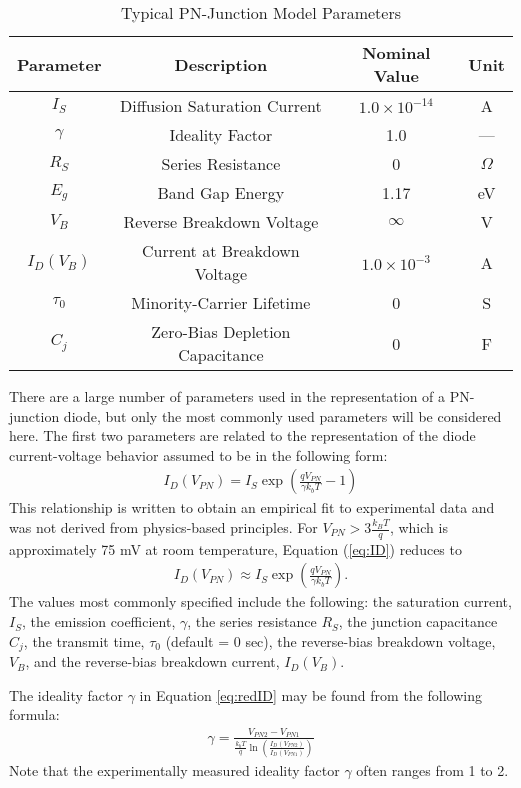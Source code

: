 \documentclass[12pt]{../manual}
\begin{document}
\begin{table}[ht!]
\caption{Typical PN-Junction Model Parameters}
\centering
\begin{tabular}{|c|c|c|c|} \hline
Parameter & Description & Nominal Value & Unit \\ \hline \hline
$I_S$ & Diffusion Saturation Current & $1.0 \times 10^{-14}$ & A \\ \hline
$\gamma$ & Ideality Factor & 1.0 & --- \\ \hline
$R_S$ & Series Resistance & 0 & $\Omega$ \\ \hline
$E_g$ & Band Gap Energy & 1.17 & eV \\ \hline
$V_B$ & Reverse Breakdown Voltage & $\infty$ & V \\ \hline
$I_D(V_B)$ & Current at Breakdown Voltage & $1.0 \times 10^{-3}$ & A \\ \hline
$\tau_0$ & Minority-Carrier Lifetime & 0 & S \\ \hline
$C_j$ & Zero-Bias Depletion Capacitance & 0 & F \\ \hline
\end{tabular}
\label{table:params}
\end{table}

There are a large number of parameters used in the representation of a PN-junction
diode, but only the most commonly used parameters will be considered here. The first
two parameters are related to the representation of the diode current-voltage behavior
assumed to be in the following form:
\begin{align}
I_D(V_{PN}) = I_S \exp\left(\frac{q V_{PN}}{\gamma k_b T} - 1\right) \label{eq:ID}
\end{align}
This relationship is written to obtain an empirical fit to experimental data and was not derived from physics-based principles. For $V_{PN} > 3\frac{k_BT}{q}$, which is
approximately 75 mV at room temperature, Equation (\ref{eq:ID}) reduces to
\begin{align}
I_D(V_{PN}) \approx I_S \exp\left(\frac{q V_{PN}}{\gamma k_b T}\right). \label{eq:redID}
\end{align}
The values most commonly specified include the following: the saturation current, $I_S$, the emission coefficient, $\gamma$, the series resistance $R_S$, the junction capacitance $C_j$, the transmit time, $\tau_0$ (default = 0 sec), the reverse-bias breakdown voltage, $V_B$, and the reverse-bias breakdown current, $I_D(V_B)$.

The ideality factor $\gamma$ in Equation \ref{eq:redID} may be found from the following formula:
\begin{align}
\gamma = \frac{V_{PN2} - V_{PN1}}{\frac{k_bT}{q}\ln\left(\frac{I_D(V_{PN2})}{I_D(V_{PN1})}\right)}
\end{align}
Note that the experimentally measured ideality factor $\gamma$ often ranges from 1 to 2.
\end{document}
